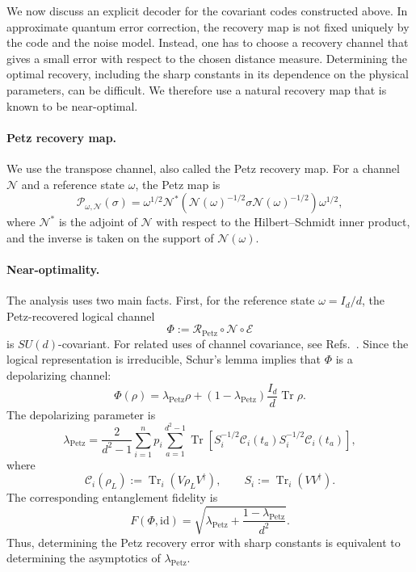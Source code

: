 \documentclass[10pt,twocolumn,superscriptaddress,aps,amsmath,amssymb,citeautoscript,floatfix,prx,longbibliography]{revtex4-2}
\theoremstyle{plain}
\theoremstyle{plain}
\theoremstyle{plain}
\theoremstyle{plain}
\theoremstyle{plain}
\theoremstyle{plain}
\begin{document}
We now discuss an explicit decoder for the covariant codes constructed above. In approximate quantum error correction, the recovery map is not fixed uniquely by the code and the noise model. Instead, one has to choose a recovery channel that gives a small error with respect to the chosen distance measure. Determining the optimal recovery, including the sharp constants in its dependence on the physical parameters, can be difficult. We therefore use a natural recovery map that is known to be near-optimal.

\paragraph{Petz recovery map.}

We use the transpose channel, also called the Petz recovery map. For a channel $\mathcal N$ and a reference state $\omega$, the Petz map is
$$
\mathcal P_{\omega,\mathcal N}(\sigma)
=
\omega^{1/2}
\mathcal N^*
\left(
\mathcal N(\omega)^{-1/2}
\sigma
\mathcal N(\omega)^{-1/2}
\right)
\omega^{1/2},
$$
where $\mathcal N^*$ is the adjoint of $\mathcal N$ with respect to the Hilbert--Schmidt inner product, and the inverse is taken on the support of $\mathcal N(\omega)$.

\paragraph{Near-optimality.}

The analysis uses two main facts. First, for the reference state $\omega=I_d/d$, the Petz-recovered logical channel
$$
\Phi
:=
\mathcal R_{\mathrm{Petz}}
\circ
\mathcal N
\circ
\mathcal E
$$
is $SU(d)$-covariant. For related uses of channel covariance, see Refs.~\cite{Zhou2021, Alexander2025}. Since the logical representation is irreducible, Schur's lemma implies that $\Phi$ is a depolarizing channel:
$$
\Phi(\rho)
=
\lambda_{\mathrm{Petz}}\rho
+
\left(1-\lambda_{\mathrm{Petz}}\right)
\frac{I_d}{d}\operatorname{Tr}\rho .
$$
The depolarizing parameter is
\begin{equation}\label{eq:lambda_P}
\lambda_{\mathrm{Petz}}
=
\frac{2}{d^2-1}
\sum_{i=1}^n p_i
\sum_{a=1}^{d^2-1}
\operatorname{Tr}
\left[
S_i^{-1/2}
\mathcal C_i(t_a)
S_i^{-1/2}
\mathcal C_i(t_a)
\right],
\end{equation}
where
$$
\mathcal C_i(\rho_L)
:=
\operatorname{Tr}_i\left(V\rho_LV^\dagger\right),
\qquad
S_i
:=
\operatorname{Tr}_i\left(VV^\dagger\right).
$$
The corresponding entanglement fidelity is
$$
F(\Phi,\mathrm{id})
=
\sqrt{
\lambda_{\mathrm{Petz}}
+
\frac{1-\lambda_{\mathrm{Petz}}}{d^2}
} .
$$
Thus, determining the Petz recovery error with sharp constants is equivalent to determining the asymptotics of $\lambda_{\mathrm{Petz}}$.
\end{document}
